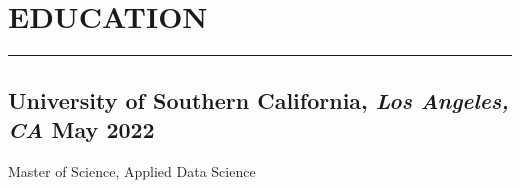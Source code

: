 \documentclass[11pt]{article}
\begin{document}


\vspace{0.1in}

\section*{\MakeUppercase{Education}}
\hrule
\medskip
\subsection*{University of Southern California{\normalfont, \textit{Los Angeles, CA} \hfill May 2022}}
Master of Science, Applied Data Science
\end{document}
